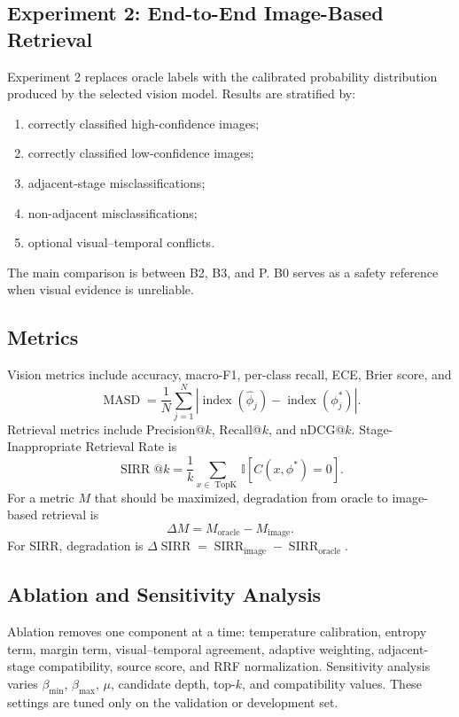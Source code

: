 \documentclass[conference]{IEEEtran}
\begin{document}
\subsection{Experiment 2: End-to-End Image-Based Retrieval}
Experiment 2 replaces oracle labels with the calibrated probability distribution produced by the selected vision model. Results are stratified by:
\begin{enumerate}[leftmargin=*,nosep]
    \item correctly classified high-confidence images;
    \item correctly classified low-confidence images;
    \item adjacent-stage misclassifications;
    \item non-adjacent misclassifications;
    \item optional visual--temporal conflicts.
\end{enumerate}
The main comparison is between B2, B3, and P. B0 serves as a safety reference when visual evidence is unreliable.

\subsection{Metrics}
Vision metrics include accuracy, macro-F1, per-class recall, ECE, Brier score, and
\begin{equation}
\operatorname{MASD}=\frac{1}{N}\sum_{j=1}^{N}|\operatorname{index}(\widehat{\phi}_j)-\operatorname{index}(\phi_j^*)|.
\end{equation}
Retrieval metrics include Precision@$k$, Recall@$k$, and nDCG@$k$. Stage-Inappropriate Retrieval Rate is
\begin{equation}
\operatorname{SIRR}@k=\frac{1}{k}\sum_{x\in\operatorname{TopK}}\mathbb{I}[C(x,\phi^*)=0].
\end{equation}
For a metric $M$ that should be maximized, degradation from oracle to image-based retrieval is
\begin{equation}
\Delta M=M_{\mathrm{oracle}}-M_{\mathrm{image}}.
\end{equation}
For SIRR, degradation is $\Delta\operatorname{SIRR}=\operatorname{SIRR}_{\mathrm{image}}-\operatorname{SIRR}_{\mathrm{oracle}}$.

\subsection{Ablation and Sensitivity Analysis}
Ablation removes one component at a time: temperature calibration, entropy term, margin term, visual--temporal agreement, adaptive weighting, adjacent-stage compatibility, source score, and RRF normalization. Sensitivity analysis varies $\beta_{\min}$, $\beta_{\max}$, $\mu$, candidate depth, top-$k$, and compatibility values. These settings are tuned only on the validation or development set.
\end{document}
